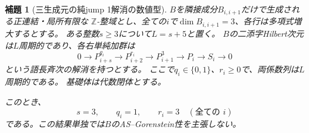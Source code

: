 \documentclass[11pt,a4paper]{ltjsarticle}
\newtheorem{lemma}[theorem]{補題}
\theoremstyle{definition}
\begin{document}
\begin{lemma}[三生成元の純jump 1解消の数値型]
\label{genidx:lem:three-light-base-numerics}
$B$を隣接成分$B_{i,i+1}$だけで生成される正連結・局所有限な
$\mathbb Z$-整域とし、全ての$i$で$\dim B_{i,i+1}=3$、各行は多項式増大するとする。
ある整数$s\geq3$について$L=s+5$と置く。
$B$の二添字Hilbert次元は$L$周期的であり、各右単純加群は
\[
0\longrightarrow P_{i+s}^{q_i}\longrightarrow P_{i+2}^{r_i}
\longrightarrow P_{i+1}^{3}\longrightarrow P_i\longrightarrow S_i\longrightarrow0
\]
という語長斉次の解消を持つとする。
ここで$q_i\in\{0,1\}$、$r_i\geq0$で、両係数列は$L$周期的である。
基礎体は代数閉体とする。

このとき、
\[
s=3,\qquad q_i=1,\qquad r_i=3\quad(\text{全ての }i)
\]
である。この結果単独では$B$のAS--Gorenstein性を主張しない。

\end{lemma}
\end{document}
